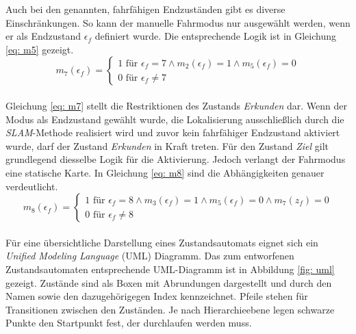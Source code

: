 		Auch bei den genannten, fahrfähigen Endzuständen gibt es diverse Einschränkungen. So kann der manuelle Fahrmodus nur ausgewählt werden, wenn er als Endzustand $\epsilon_f$ definiert wurde. Die entsprechende Logik ist in Gleichung \ref{eq: m5} gezeigt.\\
		
				\begin{equation}
					m_7(\epsilon_f)=\left\{\begin{array}{ll} 1 \text{ für } \epsilon_f=7 \wedge m_2(\epsilon_f)=1 \wedge m_5(\epsilon_f)=0 \\
						0 \text{ für }\epsilon_f\neq 7\end{array}\right.
					\label{eq: m7}
				\end{equation}\\
				
		Gleichung \ref{eq: m7} stellt die Restriktionen des Zustands \textit{Erkunden} dar. Wenn der Modus als Endzustand gewählt wurde, die Lokalisierung ausschließlich durch die \textit{SLAM}-Methode realisiert wird und zuvor kein fahrfähiger Endzustand aktiviert wurde, darf der Zustand \textit{Erkunden} in Kraft treten. Für den Zustand \textit{Ziel} gilt grundlegend diesselbe Logik für die Aktivierung. Jedoch verlangt der Fahrmodus eine statische Karte. In Gleichung \ref{eq: m8} sind die Abhängigkeiten genauer verdeutlicht.\\
		
		
				\begin{equation}
					m_8(\epsilon_f)=\left\{\begin{array}{ll} 1 \text{ für } \epsilon_f=8 \wedge m_3(\epsilon_f)=1 \wedge m_5(\epsilon_f)=0 \wedge m_7(z_f)=0 \\
						0 \text{ für }\epsilon_f\neq 8\end{array}\right.
					\label{eq: m8}
				\end{equation}\\
		
		Für eine übersichtliche Darstellung eines Zustandsautomats eignet sich ein \textit{Unified Modeling Language} (UML) Diagramm. Das zum entworfenen Zustandsautomaten entsprechende UML-Diagramm ist in Abbildung \ref{fig: uml} gezeigt. Zustände sind als Boxen mit Abrundungen dargestellt und durch den Namen sowie den dazugehörigegen Index kennzeichnet. Pfeile stehen für Transitionen zwischen den Zuständen. Je nach Hierarchieebene legen schwarze Punkte den Startpunkt fest, der durchlaufen werden muss. 
		
	
	
